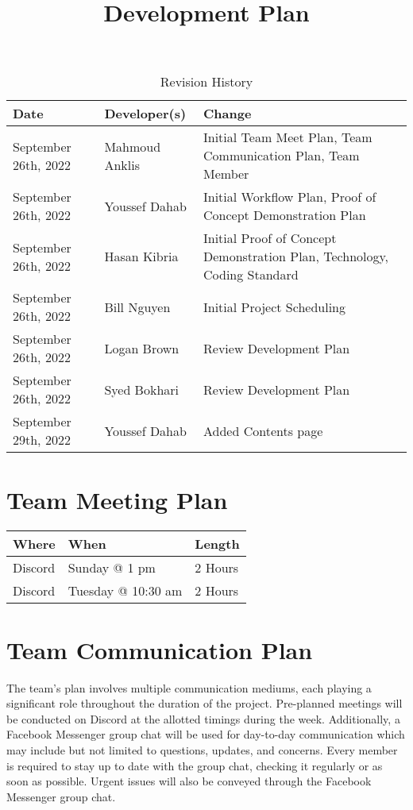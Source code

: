 \documentclass[12pt,letterpaper]{article}
\title{Development Plan\\\progname}
\author{\authname}
\date{}
\begin{document}
	
	\maketitle
	
	\begin{table}[hp]
		\caption{Revision History} \label{TblRevisionHistory}
		\begin{tabularx}{\textwidth}{llX}
			\toprule
			\textbf{Date} & \textbf{Developer(s)} & \textbf{Change}\\
			\midrule
			September 26th, 2022 & Mahmoud Anklis  & Initial Team Meet Plan, Team Communication Plan, Team Member\\
			September 26th, 2022 & Youssef Dahab  & Initial Workflow Plan, Proof of Concept Demonstration Plan \\
			September 26th, 2022 & Hasan Kibria  & Initial Proof of Concept Demonstration Plan, Technology, Coding Standard \\
			September 26th, 2022 & Bill Nguyen  & Initial Project Scheduling \\
			September 26th, 2022 & Logan Brown & Review Development Plan\\
			September 26th, 2022 & Syed Bokhari & Review Development Plan\\
			September 29th, 2022 & Youssef Dahab & Added Contents page\\
			\bottomrule
		\end{tabularx}
	\end{table}
	
	\newpage
	\tableofcontents
	\newpage
	
	\section{Team Meeting Plan}
	\begin{table}[hp]
		\begin{tabularx}{\textwidth}{|l|l|X|}
			\toprule
			\textbf{Where} & \textbf{When} & \textbf{Length}\\
			\midrule
			Discord & Sunday @ 1 pm & 2 Hours\\
			Discord & Tuesday @ 10:30 am & 2 Hours\\
			\bottomrule
		\end{tabularx}
	\end{table}
	
	\section{Team Communication Plan}
	The team’s plan involves multiple communication mediums, each playing a significant role throughout the duration of the project. Pre-planned meetings will be conducted on Discord at the allotted timings during the week. Additionally, a Facebook Messenger group chat will be used for day-to-day communication which may include but not limited to questions, updates, and concerns. Every member is required to stay up to date with the group chat, checking it regularly or as soon as possible. Urgent issues will also be conveyed through the Facebook Messenger group chat. 
\end{document}
